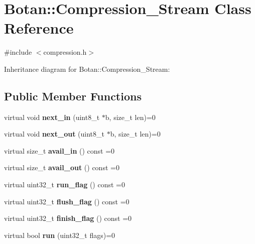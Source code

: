 \hypertarget{class_botan_1_1_compression___stream}{}\section{Botan\+:\+:Compression\+\_\+\+Stream Class Reference}
\label{class_botan_1_1_compression___stream}


{\ttfamily \#include $<$compression.\+h$>$}



Inheritance diagram for Botan\+:\+:Compression\+\_\+\+Stream\+:
\subsection*{Public Member Functions}
\begin{DoxyCompactItemize}
\item 
\mbox{\label{class_botan_1_1_compression___stream_a2d1375dc24d1d988095d27d9fa274253}} 
virtual void {\bfseries next\+\_\+in} (uint8\+\_\+t $\ast$b, size\+\_\+t len)=0
\item 
\mbox{\label{class_botan_1_1_compression___stream_ad6d8a0fe5050419c7a1400fb524ec105}} 
virtual void {\bfseries next\+\_\+out} (uint8\+\_\+t $\ast$b, size\+\_\+t len)=0
\item 
\mbox{\label{class_botan_1_1_compression___stream_a5db0a002cb97d48b66d7848e11531dc4}} 
virtual size\+\_\+t {\bfseries avail\+\_\+in} () const =0
\item 
\mbox{\label{class_botan_1_1_compression___stream_aac16c406887274940edaeda64938ccbf}} 
virtual size\+\_\+t {\bfseries avail\+\_\+out} () const =0
\item 
\mbox{\label{class_botan_1_1_compression___stream_ac526147e38c2b53d99a8b901ad0fa44f}} 
virtual uint32\+\_\+t {\bfseries run\+\_\+flag} () const =0
\item 
\mbox{\label{class_botan_1_1_compression___stream_ad9854c89c7c9ae375ac15170486c13e1}} 
virtual uint32\+\_\+t {\bfseries flush\+\_\+flag} () const =0
\item 
\mbox{\label{class_botan_1_1_compression___stream_a9ec264f5ce839e2f6bc3152c93e4142d}} 
virtual uint32\+\_\+t {\bfseries finish\+\_\+flag} () const =0
\item 
\mbox{\label{class_botan_1_1_compression___stream_ad43789a87329a1306e70523bc108d073}} 
virtual bool {\bfseries run} (uint32\+\_\+t flags)=0
\end{DoxyCompactItemize}


